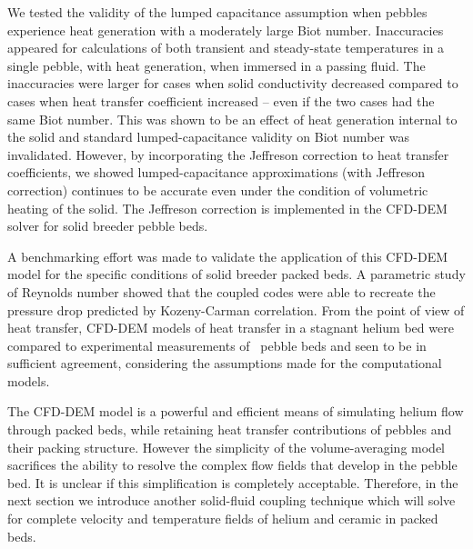 We tested the validity of the lumped capacitance assumption when pebbles experience heat generation with a moderately large Biot number. Inaccuracies appeared for calculations of both transient and steady-state temperatures in a single pebble, with heat generation, when immersed in a passing fluid. The inaccuracies were larger for cases when solid conductivity decreased compared to cases when heat transfer coefficient increased -- even if the two cases had the same Biot number. This was shown to be an effect of heat generation internal to the solid and standard lumped-capacitance validity on Biot number was invalidated. However, by incorporating the Jeffreson correction to heat transfer coefficients, we showed lumped-capacitance approximations (with Jeffreson correction) continues to be accurate even under the condition of volumetric heating of the solid. The Jeffreson correction is implemented in the CFD-DEM solver for solid breeder pebble beds.

A benchmarking effort was made to validate the application of this CFD-DEM model for the specific conditions of solid breeder packed beds. A parametric study of Reynolds number showed that the coupled codes were able to recreate the pressure drop predicted by Kozeny-Carman correlation. From the point of view of heat transfer, CFD-DEM models of heat transfer in a stagnant helium bed were compared to experimental measurements of \lit~pebble beds and seen to be in sufficient agreement, considering the assumptions made for the computational models.

The CFD-DEM model is a powerful and efficient means of simulating helium flow through packed beds, while retaining heat transfer contributions of pebbles and their packing structure. However the simplicity of the volume-averaging model sacrifices the ability to resolve the complex flow fields that develop in the pebble bed. It is unclear if this simplification is completely acceptable. Therefore, in the next section we introduce another solid-fluid coupling technique which will solve for complete velocity and temperature fields of helium and ceramic in packed beds.